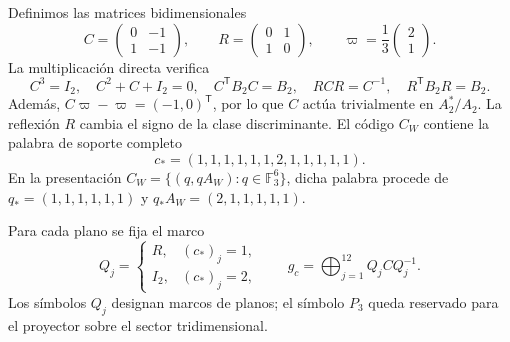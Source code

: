 \documentclass[a4paper,10pt]{article}
\theoremstyle{definition}\newtheorem{definition}[theorem]{Definición}
\theoremstyle{remark}\newtheorem{remark}[theorem]{Observación}
\numberwithin{equation}{section}
\begin{document}
Definimos las matrices bidimensionales
\[
 C=\begin{pmatrix}0&-1\\1&-1\end{pmatrix},
 \qquad
 R=\begin{pmatrix}0&1\\1&0\end{pmatrix},
 \qquad
 \varpi=\frac13\begin{pmatrix}2\\1\end{pmatrix}.
\]
La multiplicación directa verifica
\[
 C^3=I_2,\quad C^2+C+I_2=0,\quad
 C^{\mathsf T}B_2C=B_2,\quad
 RCR=C^{-1},\quad R^{\mathsf T}B_2R=B_2.
\]
Además, \(C\varpi-\varpi=(-1,0)^{\mathsf T}\), por lo que \(C\)
actúa trivialmente en \(A_2^*/A_2\). La reflexión \(R\) cambia el signo
de la clase discriminante. El código \(C_W\) contiene la palabra de
soporte completo
\[
 c_*=(1,1,1,1,1,1,2,1,1,1,1,1).
\]
En la presentación \(C_W=\{(q,qA_W):q\in\mathbb F_3^6\}\), dicha
palabra procede de \(q_*=(1,1,1,1,1,1)\) y
\(q_*A_W=(2,1,1,1,1,1)\).

Para cada plano se fija el marco
\begin{equation}
 Q_j=\begin{cases}
 R,&(c_*)_j=1,\\
 I_2,&(c_*)_j=2,
 \end{cases}
 \qquad
 g_c=\bigoplus_{j=1}^{12}Q_jCQ_j^{-1}.
 \label{eq:leech-c3}
\end{equation}
Los símbolos \(Q_j\) designan marcos de planos; el símbolo \(P_3\)
queda reservado para el proyector sobre el sector tridimensional.
\end{document}
